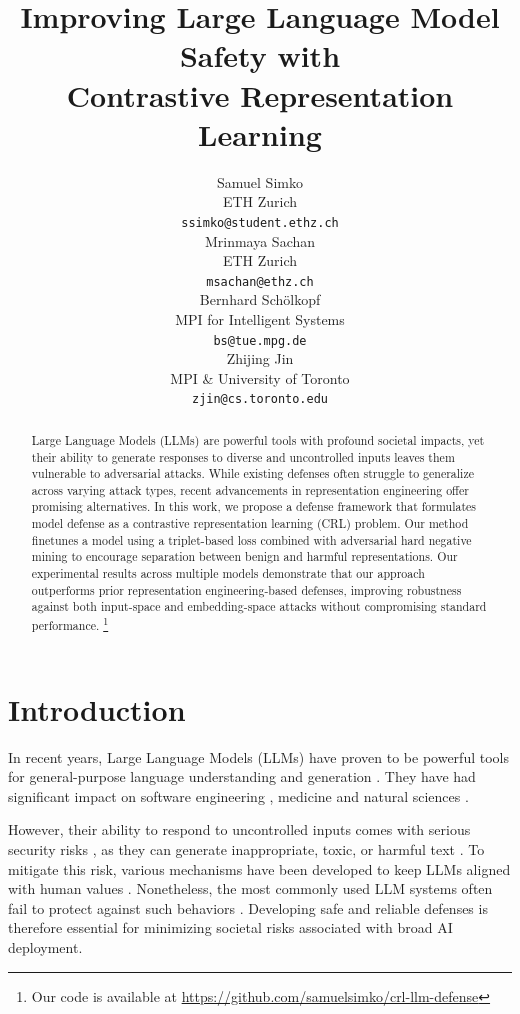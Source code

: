 \documentclass[11pt]{article}
\title{Improving Large Language Model Safety with 
\\
Contrastive Representation Learning}
\author{Samuel Simko%
\\
  ETH Zurich \\
  \texttt{ssimko@student.ethz.ch} \\\And
  Mrinmaya Sachan%
  \\
  ETH Zurich \\
  \texttt{msachan@ethz.ch} \\\AND
  Bernhard Sch\"olkopf \\
  MPI for Intelligent Systems \\
  \texttt{bs@tue.mpg.de} \\\And
  Zhijing Jin \\
  MPI \& University of Toronto \\
  \texttt{zjin@cs.toronto.edu} \\
}
\begin{document}
\maketitle
\begin{abstract}
Large Language Models (LLMs) are powerful tools with profound societal impacts,
yet their ability to generate responses to diverse and uncontrolled inputs
leaves them vulnerable to adversarial attacks. While existing defenses often
struggle to generalize across varying attack types, recent advancements in
representation engineering offer promising alternatives. In this work, we
propose a defense framework that formulates model defense as a contrastive
representation learning (CRL) problem. Our method finetunes a model using
a triplet-based loss combined with adversarial hard negative mining to encourage
separation between benign and harmful representations. Our experimental results
across multiple models demonstrate that our approach outperforms prior
representation engineering-based defenses, improving robustness against both
input-space and embedding-space attacks without compromising standard
performance. \footnote{Our code is available at \url{https://github.com/samuelsimko/crl-llm-defense}}
\end{abstract}

\section{Introduction}

In recent years, Large Language Models (LLMs) have proven to be powerful tools for general-purpose language understanding and generation \citep{minaee2024largelanguagemodelssurvey}.
They have had significant impact on software engineering \citep{hou2024largelanguagemodelssoftware}, medicine \citep{zhou2024surveylargelanguagemodels} and natural
sciences \citep{nejjar2024llmsscienceusagecode}.

However, their ability to respond to uncontrolled inputs comes with serious security risks \citep{geiping2024coercingllmsrevealalmost}, as they can generate inappropriate, toxic, or harmful text \citep{deshpande2023toxicitychatgptanalyzingpersonaassigned}. To mitigate this risk, various mechanisms have been developed to keep LLMs aligned with human values \citep{stiennon2022learningsummarizehumanfeedback, bai2022traininghelpfulharmlessassistant, rafailov2024directpreferenceoptimizationlanguage}.
Nonetheless, the most commonly used LLM systems often fail to protect against such behaviors \citep{zou2023universaltransferableadversarialattacks, chao2023jailbreaking}.
Developing safe and reliable defenses is therefore essential for minimizing societal risks associated with broad AI deployment.
\end{document}
